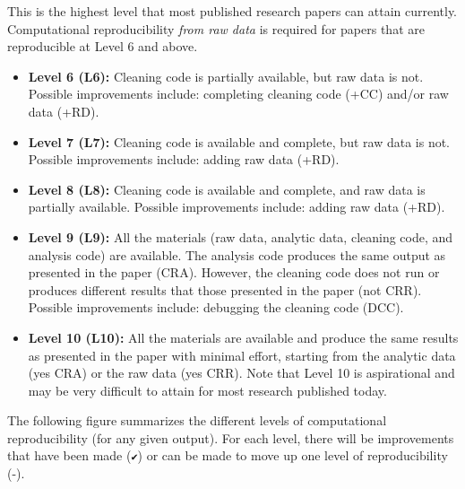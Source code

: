 \documentclass[]{book}
\begin{document}
This is the highest level that most published research papers can attain currently. Computational reproducibility \emph{from raw data} is required for papers that are reproducible at Level 6 and above.

\begin{itemize}
\item
  \textbf{Level 6 (L6):} Cleaning code is partially available, but raw data is not. Possible improvements include: completing cleaning code (+CC) and/or raw data (+RD).
\item
  \textbf{Level 7 (L7):} Cleaning code is available and complete, but raw data is not. Possible improvements include: adding raw data (+RD).
\item
  \textbf{Level 8 (L8):} Cleaning code is available and complete, and raw data is partially available. Possible improvements include: adding raw data (+RD).
\item
  \textbf{Level 9 (L9):} All the materials (raw data, analytic data, cleaning code, and analysis code) are available. The analysis code produces the same output as presented in the paper (CRA). However, the cleaning code does not run or produces different results that those presented in the paper (not CRR). Possible improvements include: debugging the cleaning code (DCC).
\item
  \textbf{Level 10 (L10):} All the materials are available and produce the same results as presented in the paper with minimal effort, starting from the analytic data (yes CRA) or the raw data (yes CRR). Note that Level 10 is aspirational and may be very difficult to attain for most research published today.
\end{itemize}

The following figure summarizes the different levels of computational reproducibility (for any given output). For each level, there will be improvements that have been made (\texttt{✔}) or can be made to move up one level of reproducibility (-).
\end{document}
